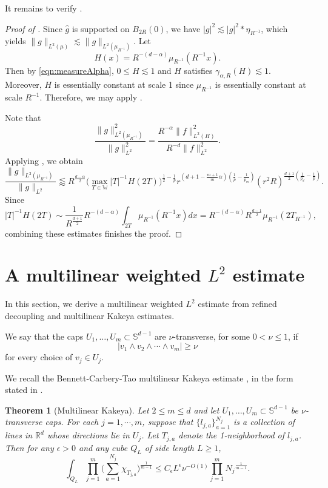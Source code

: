 \documentclass[11pt]{amsart}
\newtheorem{theorem}{Theorem}[section]
\theoremstyle{definition}
\theoremstyle{remark}
\numberwithin{equation}{section}
\renewcommand{\hat}{\widehat}
\renewcommand{\S}{\mathbb{S}}
\newcommand{\R}{\mathbb{R}}
\newcommand{\W}{\mathbb{W}}
\newcommand{\les}{\lesssim}
\newcommand{\less}{\lessapprox}
\begin{document}
It remains to verify .
\begin{proof}[Proof of ]
	Since $\hat{g}$ is supported on $B_{2R}(0)$, we have $|g|^2 \les |g|^2*\eta_{R^{-1}}$, which yields $\| g\|_{L^2(\mu)} \les \| g\|_{L^2(\mu_{R^{-1}} )}$. Let 
	\[ H(x) = R^{-(d-\alpha)}\mu_{R^{-1}}  (R^{-1}x).\]
	Then by \eqref{eqn:measureAlpha}, $0\leq H\les 1$ and $H$ satisfies $\gamma_{\alpha,R}(H) \les 1$.
	Moreover, $H$ is essentially constant at scale 1 since $\mu_{R^{-1}}$ is essentially constant at scale $R^{-1}$. Therefore, we may apply  .
	
	Note that 
	\[ \frac{ \| g\|_{L^2(\mu_{R^{-1}} )}^2}{\| g\|_{L^2}^2} = \frac{ R^{-\alpha} \| f\|_{L^2(H)}^2}{ R^{-d} \| f\|_{L^2}^2}. \]
	Applying , we obtain
	\[  \frac{ \| g\|_{L^2(\mu_{R^{-1}} )} }{ \| g\|_{L^2}} \less R^{\frac{d-\alpha}{2}}  \big( \max_{T\in \W} |T|^{-1} H(2T) \big)^{\frac{1}{2}-\frac{1}{p}} r^{(d+1 - \frac{m+1}{m}\alpha)(\frac{1}{p}-\frac{1}{p_m})} (r^2 R)^{\frac{d+1}{2}(\frac{1}{p_d} -\frac{1}{p})}. \]
	Since
	\[ |T|^{-1}  H(2T)  \sim \frac{1}{R^{\frac{d+1}{2}}} R^{-(d-\alpha)}\int_{2T}  \mu_{R^{-1}}  (R^{-1}x) dx = R^{-(d-\alpha)} R^\frac{d-1}{2}  \mu_{R^{-1}}(2T_{R^{-1}}),\]
	combining these estimates finishes the proof.
	
\end{proof}


\section{A multilinear weighted $L^2$ estimate}\label{sec:refined}
In this section, we derive a multilinear weighted $L^2$ estimate from refined decoupling and multilinear Kakeya estimates. 

We say that the caps $U_1,\ldots,U_m\subset \S^{d-1}$ are $\nu$-transverse, for some $0<\nu\leq 1$, if
\[ 
	|v_1\wedge v_2\wedge\cdots\wedge v_m|\geq \nu
\]
for every choice of $v_j\in U_j$. 

We recall the Bennett-Carbery-Tao multilinear Kakeya estimate \cite[Theorem 5.1]{BCT}, in the form stated in \cite[Theorem 4.4]{DGLZ}. 
\begin{theorem}[Multilinear Kakeya]\label{thm:multiKakeya} 	
	Let $2\leq m \leq d$ and let $U_1,\ldots,U_m\subset \S^{d-1}$ be $\nu$-transverse caps. 
	For each $j=1,\cdots,m$, suppose that $\{ l_{j,a} \}_{a=1}^{N_j}$ is a collection of lines in $\R^{d}$ whose directions lie in $U_j$. Let $T_{j,a}$ denote the 1-neighborhood of $l_{j,a}$. Then for any $\epsilon>0$ and any cube $Q_L$ of side length $L\geq 1$,
	\[ \int_{Q_L} \prod_{j=1}^m \bigg( \sum_{a=1}^{N_j} \chi_{T_{j,a}}\bigg)^{\frac{1}{m-1}} \leq   C_\epsilon L^{\epsilon}  \nu^{-O(1)}  \prod_{j=1}^m {N_j}^{\frac{1}{m-1}}.\]
\end{theorem}
\end{document}
